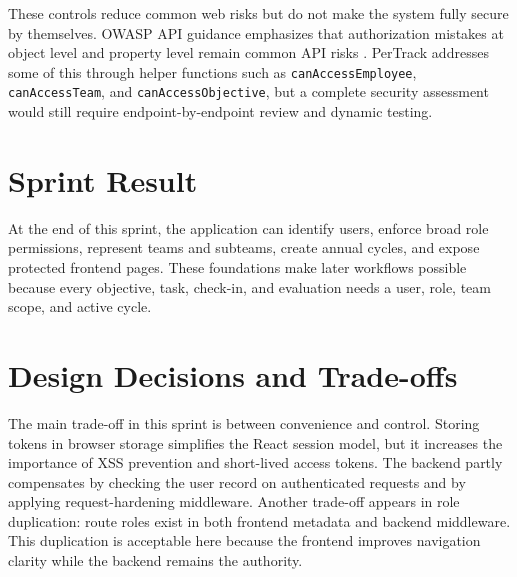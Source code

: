These controls reduce common web risks but do not make the system fully secure by themselves. OWASP API guidance emphasizes that authorization mistakes at object level and property level remain common API risks \cite{owaspApi}. PerTrack addresses some of this through helper functions such as \texttt{canAccessEmployee}, \texttt{canAccessTeam}, and \texttt{canAccessObjective}, but a complete security assessment would still require endpoint-by-endpoint review and dynamic testing.

\section{Sprint Result}
At the end of this sprint, the application can identify users, enforce broad role permissions, represent teams and subteams, create annual cycles, and expose protected frontend pages. These foundations make later workflows possible because every objective, task, check-in, and evaluation needs a user, role, team scope, and active cycle.

\section{Design Decisions and Trade-offs}
The main trade-off in this sprint is between convenience and control. Storing tokens in browser storage simplifies the React session model, but it increases the importance of XSS prevention and short-lived access tokens. The backend partly compensates by checking the user record on authenticated requests and by applying request-hardening middleware. Another trade-off appears in role duplication: route roles exist in both frontend metadata and backend middleware. This duplication is acceptable here because the frontend improves navigation clarity while the backend remains the authority.
